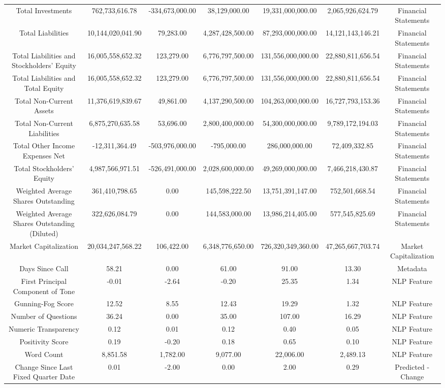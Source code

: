 \begin{longtable}{ccccccc}
Total Investments & 762,733,616.78 & -334,673,000.00 & 38,129,000.00 & 19,331,000,000.00 & 2,065,926,624.79 & Financial Statements \\
Total Liabilities & 10,144,020,041.90 & 79,283.00 & 4,287,428,500.00 & 87,293,000,000.00 & 14,121,143,146.21 & Financial Statements \\
Total Liabilities and Stockholders' Equity & 16,005,558,652.32 & 123,279.00 & 6,776,797,500.00 & 131,556,000,000.00 & 22,880,811,656.54 & Financial Statements \\
Total Liabilities and Total Equity & 16,005,558,652.32 & 123,279.00 & 6,776,797,500.00 & 131,556,000,000.00 & 22,880,811,656.54 & Financial Statements \\
Total Non-Current Assets & 11,376,619,839.67 & 49,861.00 & 4,137,290,500.00 & 104,263,000,000.00 & 16,727,793,153.36 & Financial Statements \\
Total Non-Current Liabilities & 6,875,270,635.58 & 53,696.00 & 2,800,400,000.00 & 54,300,000,000.00 & 9,789,172,194.03 & Financial Statements \\
Total Other Income Expenses Net & -12,311,364.49 & -503,976,000.00 & -795,000.00 & 286,000,000.00 & 72,409,332.85 & Financial Statements \\
Total Stockholders' Equity & 4,987,566,971.51 & -526,491,000.00 & 2,028,600,000.00 & 49,269,000,000.00 & 7,466,218,430.87 & Financial Statements \\
Weighted Average Shares Outstanding & 361,410,798.65 & 0.00 & 145,598,222.50 & 13,751,391,147.00 & 752,501,668.54 & Financial Statements \\
Weighted Average Shares Outstanding (Diluted) & 322,626,084.79 & 0.00 & 144,583,000.00 & 13,986,214,405.00 & 577,545,825.69 & Financial Statements \\
Market Capitalization & 20,034,247,568.22 & 106,422.00 & 6,348,776,650.00 & 726,320,349,360.00 & 47,265,667,703.74 & Market Capitalization \\
Days Since Call & 58.21 & 0.00 & 61.00 & 91.00 & 13.30 & Metadata \\
First Principal Component of Tone & -0.01 & -2.64 & -0.20 & 25.35 & 1.34 & NLP Feature \\
Gunning-Fog Score & 12.52 & 8.55 & 12.43 & 19.29 & 1.32 & NLP Feature \\
Number of Questions & 36.24 & 0.00 & 35.00 & 107.00 & 16.29 & NLP Feature \\
Numeric Transparency & 0.12 & 0.01 & 0.12 & 0.40 & 0.05 & NLP Feature \\
Positivity Score & 0.19 & -0.20 & 0.18 & 0.65 & 0.10 & NLP Feature \\
Word Count & 8,851.58 & 1,782.00 & 9,077.00 & 22,006.00 & 2,489.13 & NLP Feature \\
Change Since Last Fixed Quarter Date & 0.01 & -2.00 & 0.00 & 2.00 & 0.29 & Predicted - Change \\
\end{longtable}
